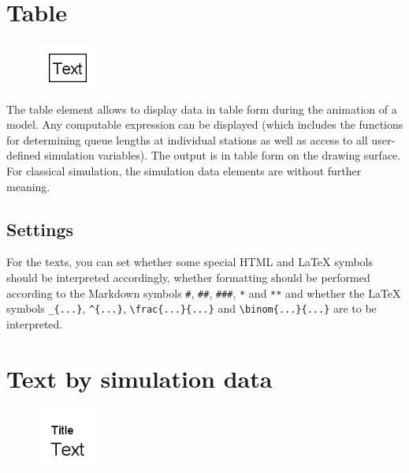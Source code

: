 \section{Table}
\label{ref:ModelElementAnimationTable}

\begin{figure}
\vspace{-22pt}
\includegraphics[width=2cm]{imageModelElementAnimationTable.png}
\vspace{-22pt}
\end{figure}

The table element allows to display data in table form during the animation of a model.
Any computable expression can be displayed (which includes the functions for determining queue lengths at
individual stations as well as access to all user-defined simulation variables). The output is in table form
on the drawing surface. For classical simulation, the simulation data elements are without further meaning.

\subsection*{Settings}

For the texts, you can set whether some special HTML and LaTeX symbols should
be interpreted accordingly, whether formatting should be performed according to the Markdown symbols
\texttt{\#}, \texttt{\#\#}, \texttt{\#\#\#}, \texttt{*} and \texttt{**} and whether the LaTeX symbols
\texttt{\_\{...\}}, \texttt{\^{}\{...\}}, \texttt{\textbackslash frac\{...\}\{...\}} and \texttt{\textbackslash binom\{...\}\{...\}}
are to be interpreted.


\section{Text by simulation data}
\label{ref:ModelElementAnimationTextSelect}

\begin{figure}
\vspace{-22pt}
\includegraphics[width=2cm]{imageModelElementAnimationTextSelect.png}
\vspace{-22pt}
\end{figure}

